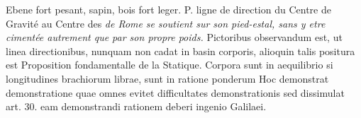\pstart%
[127~r\textsuperscript{o}]
Ebene  fort pesant, sapin, bois fort leger.
\protect{}P. 
ligne de direction du
 Centre de Gravit\'{e} au Centre des
\pend%
\pstart%
\textit{de Rome}\protect{} \textit{se soutient sur son pied-estal, sans y etre ciment\'{e}e autrement que par son propre poids.} 
\pend%
 Pictoribus observandum est, ut linea directionibus, nunquam non cadat in basin corporis, alioquin talis positura est  
\pend 
\count{}
\count{}
\pstart {} Proposition fondamentalle de la Statique. Corpora sunt in aequilibrio si longitudines brachiorum librae, sunt in ratione ponderum  Hoc demonstrat demonstratione quae omnes evitet difficultates demonstrationis  sed dissimulat art. 30. eam demonstrandi rationem deberi ingenio Galilaei\protect{}. 
